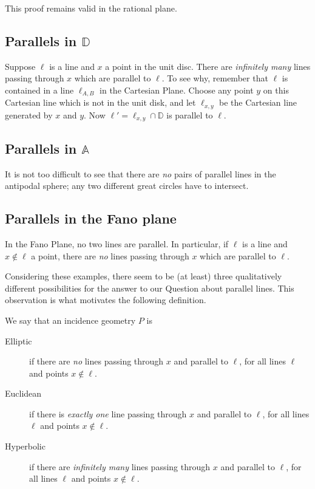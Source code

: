 This proof remains valid in the rational plane.


\subsection{Parallels in \(\mathbb{D}\)}

Suppose \(\ell\) is a line and \(x\) a point in the unit disc.
There are \emph{infinitely many} lines passing through \(x\) which are parallel to \(\ell\).
To see why, remember that \(\ell\) is contained in a line \(\ell_{A,B}\) in the Cartesian Plane.
Choose any point \(y\) on this Cartesian line which is not in the unit disk, and let \(\ell_{x,y}\) be the Cartesian line generated by \(x\) and \(y\).
Now \(\ell' = \ell_{x,y} \cap \mathbb{D}\) is parallel to \(\ell\).



\subsection{Parallels in \(\mathbb{A}\)}

It is not too difficult to see that there are \emph{no} pairs of parallel lines in the antipodal sphere; any two different great circles have to intersect.




\subsection{Parallels in the Fano plane}

In the Fano Plane, no two lines are parallel.
In particular, if \(\ell\) is a line and \(x \notin \ell\) a point, there are \emph{no} lines passing through \(x\) which are parallel to \(\ell\).



Considering these examples, there seem to be (at least) three qualitatively different possibilities for the answer to our Question about parallel lines.
This observation is what motivates the following definition.

\begin{dfn}
We say that an incidence geometry \(P\) is
\begin{description}
\item[Elliptic] if there are \emph{no} lines passing through \(x\) and parallel to \(\ell\), for all lines \(\ell\) and points \(x \notin \ell\).
\item[Euclidean] if there is \emph{exactly one} line passing through \(x\) and parallel to \(\ell\), for all lines \(\ell\) and points \(x \notin \ell\).
\item[Hyperbolic] if there are \emph{infinitely many} lines passing through \(x\) and parallel to \(\ell\), for all lines \(\ell\) and points \(x \notin \ell\).
\end{description}
\end{dfn}

